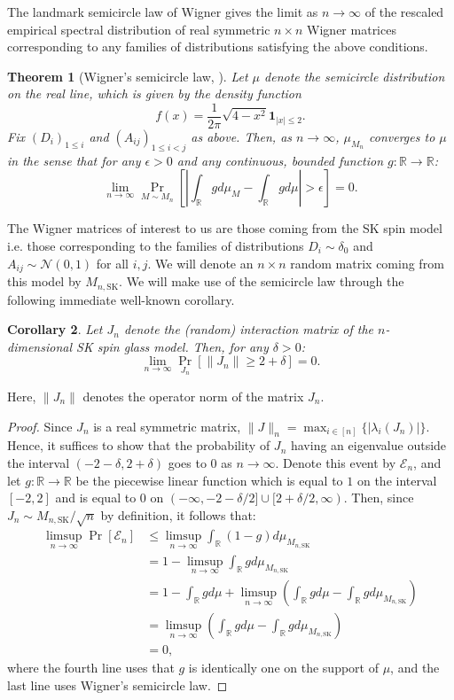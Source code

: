 \documentclass[11pt, oneside, english]{article}
\newcommand{\R}{\mathbb{R}}
\newtheorem{theorem}{Theorem}[section]
\newtheorem{corollary}[theorem]{Corollary}
\theoremstyle{definition}
\theoremstyle{plain}
\begin{document}
The landmark semicircle law of Wigner gives the limit as $n \to \infty$ of the rescaled empirical spectral distribution of real symmetric $n\times n$ Wigner matrices corresponding to any families of distributions satisfying the above conditions. 
\begin{theorem}[Wigner's semicircle law, \cite{wigner1958distribution}]
Let $\mu$ denote the semicircle distribution on the real line, which is given by the density function
$$f(x) = \frac{1}{2\pi}\sqrt{4-x^{2}}\mathbf{1}_{|x|\leq 2}.$$
Fix $(D_i)_{1\leq i}$ and $(A_{ij})_{1\leq i<j}$ as above. Then, as $n\to \infty$, $\mu_{M_n}$ converges to $\mu$ in the sense that for any $\epsilon > 0$ and any continuous, bounded function $g\colon \R\to \R$:
$$\lim_{n \to \infty}\Pr_{M \sim M_n}\left[\left|\int_{\R}{gd\mu_{M} - \int_{\R}{gd\mu}}\right|>\epsilon\right]=0.$$
\end{theorem}
The Wigner matrices of interest to us are those coming from the SK spin model i.e. those corresponding to the families of distributions $D_i \sim \delta_{0}$ and $A_{ij} \sim \mathcal{N}(0,1)$ for all $i,j$. We will denote an $n\times n$ random matrix coming from this model by $M_{n,\text{SK}}$. We will make use of the semicircle law through the following immediate well-known corollary. 
\begin{corollary}
\label{corollary:spectral-norm-bound}
Let $J_n$ denote the (random) interaction matrix of the $n$-dimensional SK spin glass model. Then, for any $\delta > 0$:
$$\lim_{n\to \infty}\Pr_{J_n}\left[\|J_{n}\| \geq 2+\delta \right]= 0.$$
\end{corollary}
Here, $\|J_{n}\|$ denotes the operator norm of the matrix $J_{n}$. 
\begin{proof}
Since $J_n$ is a real symmetric matrix, $\|J\|_n = \max_{i\in [n]}\{|\lambda_i(J_n)|\}$. Hence, it suffices to show that the probability of $J_n$ having an eigenvalue outside the interval $(-2-\delta, 2+\delta)$ goes to $0$ as $n\to \infty$. Denote this event by $\mathcal{E}_{n}$, and let $g:\R\to\R$ be the piecewise linear function which is equal to $1$ on the interval $[-2,2]$ and is equal to $0$ on $(-\infty,-2-\delta/2]\cup [2+\delta/2,\infty)$. Then, since $J_n\sim M_{n,\text{SK}}/\sqrt{n}$ by definition, it follows that:
\begin{align*}
\limsup_{n\to\infty}\Pr[\mathcal{E}_{n}] & \leq\limsup_{n\to\infty}\int_{\R}(1-g)d\mu_{M_{n,\text{SK}}}\\
 & =1-\limsup_{n\to\infty}\int_{\R}gd\mu_{M_{n,\text{SK}}}\\
 & =1-\int_{\R}gd\mu+\limsup_{n\to\infty}\left(\int_{\R}gd\mu-\int_{\R}gd\mu_{M_{n,\text{SK}}}\right)\\
 & =\limsup_{n\to\infty}\left(\int_{\R}gd\mu-\int_{\R}gd\mu_{M_{n,\text{SK}}}\right)\\
 & =0,
\end{align*}
where the fourth line uses that $g$ is identically one on the support of $\mu$, and the last line uses Wigner's semicircle law. 
\end{proof}
\end{document}
